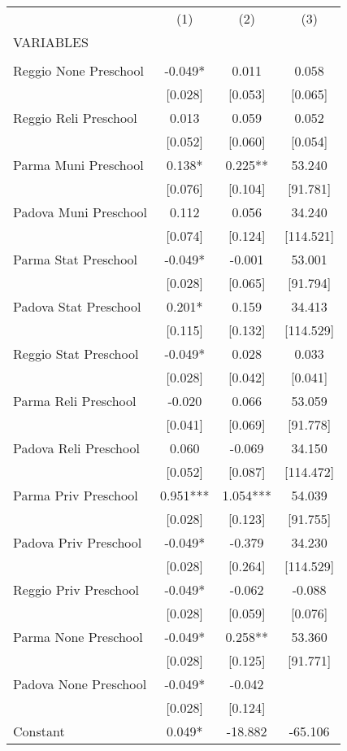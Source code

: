 \begin{tabular}{lccc} \hline
 & (1) & (2) & (3) \\
VARIABLES &  &  &  \\ \hline
 &  &  &  \\
Reggio None Preschool & -0.049* & 0.011 & 0.058 \\
 & [0.028] & [0.053] & [0.065] \\
Reggio Reli Preschool & 0.013 & 0.059 & 0.052 \\
 & [0.052] & [0.060] & [0.054] \\
Parma Muni Preschool & 0.138* & 0.225** & 53.240 \\
 & [0.076] & [0.104] & [91.781] \\
Padova Muni Preschool & 0.112 & 0.056 & 34.240 \\
 & [0.074] & [0.124] & [114.521] \\
Parma Stat Preschool & -0.049* & -0.001 & 53.001 \\
 & [0.028] & [0.065] & [91.794] \\
Padova Stat Preschool & 0.201* & 0.159 & 34.413 \\
 & [0.115] & [0.132] & [114.529] \\
Reggio Stat Preschool & -0.049* & 0.028 & 0.033 \\
 & [0.028] & [0.042] & [0.041] \\
Parma Reli Preschool & -0.020 & 0.066 & 53.059 \\
 & [0.041] & [0.069] & [91.778] \\
Padova Reli Preschool & 0.060 & -0.069 & 34.150 \\
 & [0.052] & [0.087] & [114.472] \\
Parma Priv Preschool & 0.951*** & 1.054*** & 54.039 \\
 & [0.028] & [0.123] & [91.755] \\
Padova Priv Preschool & -0.049* & -0.379 & 34.230 \\
 & [0.028] & [0.264] & [114.529] \\
Reggio Priv Preschool & -0.049* & -0.062 & -0.088 \\
 & [0.028] & [0.059] & [0.076] \\
Parma None Preschool & -0.049* & 0.258** & 53.360 \\
 & [0.028] & [0.125] & [91.771] \\
Padova None Preschool & -0.049* & -0.042 &  \\
 & [0.028] & [0.124] &  \\
Constant & 0.049* & -18.882 & -65.106 \\

\end{tabular}
